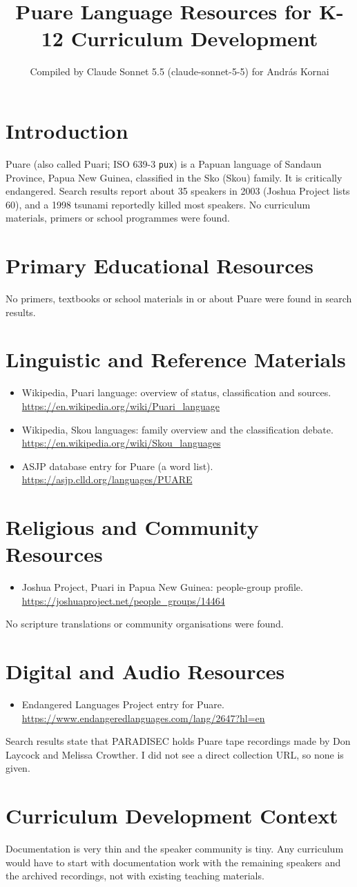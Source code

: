 \documentclass[12pt]{article}
\title{Puare Language Resources for K-12 Curriculum Development}
\author{Compiled by Claude Sonnet 5.5 (claude-sonnet-5-5) for Andr\'as Kornai}
\date{}
\begin{document}
\maketitle

\section{Introduction}
Puare (also called Puari; ISO 639-3 \texttt{pux}) is a Papuan language of Sandaun Province, Papua New Guinea, classified in the Sko (Skou) family. It is critically endangered. Search results report about 35 speakers in 2003 (Joshua Project lists 60), and a 1998 tsunami reportedly killed most speakers. No curriculum materials, primers or school programmes were found.

\section{Primary Educational Resources}
No primers, textbooks or school materials in or about Puare were found in search results.

\section{Linguistic and Reference Materials}
\begin{itemize}
\item Wikipedia, Puari language: overview of status, classification and sources. \url{https://en.wikipedia.org/wiki/Puari_language}
\item Wikipedia, Skou languages: family overview and the classification debate. \url{https://en.wikipedia.org/wiki/Skou_languages}
\item ASJP database entry for Puare (a word list). \url{https://asjp.clld.org/languages/PUARE}
\end{itemize}

\section{Religious and Community Resources}
\begin{itemize}
\item Joshua Project, Puari in Papua New Guinea: people-group profile. \url{https://joshuaproject.net/people_groups/14464}
\end{itemize}
No scripture translations or community organisations were found.

\section{Digital and Audio Resources}
\begin{itemize}
\item Endangered Languages Project entry for Puare. \url{https://www.endangeredlanguages.com/lang/2647?hl=en}
\end{itemize}
Search results state that PARADISEC holds Puare tape recordings made by Don Laycock and Melissa Crowther. I did not see a direct collection URL, so none is given.

\section{Curriculum Development Context}
Documentation is very thin and the speaker community is tiny. Any curriculum would have to start with documentation work with the remaining speakers and the archived recordings, not with existing teaching materials.
\end{document}
